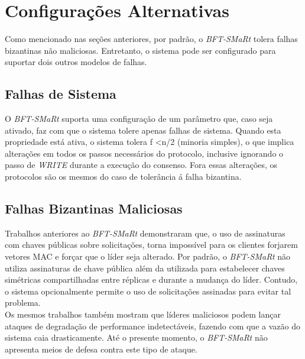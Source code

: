 	 \section{Configurações Alternativas}
	 
	 Como mencionado nas seções anteriores, por padrão, o \textit{BFT-SMaRt} tolera falhas bizantinas não maliciosas. Entretanto, o sistema pode ser configurado para suportar dois outros modelos de falhas.\\
	 
	 	\subsection{Falhas de Sistema}
	 	O \textit{BFT-SMaRt} suporta uma configuração de um parâmetro que, caso seja ativado, faz com que o sistema tolere apenas falhas de sistema. Quando esta propriedade está ativa, o sistema tolera  f \textless  n/2 (minoria simples), o que implica alterações em todos os passos necessários do protocolo, inclusive ignorando o passo de \textit{WRITE} durante a execução do consenso. Fora essas alterações, os protocolos são os mesmos do caso de tolerância á falha bizantina. 
	 	
	 	\subsection{Falhas Bizantinas Maliciosas}
	 	Trabalhos anteriores ao \textit{BFT-SMaRt} demonstraram que, o uso de assinaturas com chaves públicas sobre solicitações, torna impossível para os clientes forjarem vetores MAC e forçar que o líder seja alterado. Por padrão, o \textit{BFT-SMaRt} não utiliza assinaturas de chave pública além da utilizada para estabelecer chaves simétricas compartilhadas entre réplicas e durante a mudança do líder. Contudo, o sistema opcionalmente permite o uso de solicitações assinadas para evitar tal problema.\\
	 	
	 	Os mesmos trabalhos também mostram que líderes maliciosos podem lançar ataques de degradação de performance indetectáveis, fazendo com que a vazão do sistema caia drasticamente. Até o presente momento, o \textit{BFT-SMaRt} não apresenta meios de defesa contra este tipo de ataque. \\
	 	
